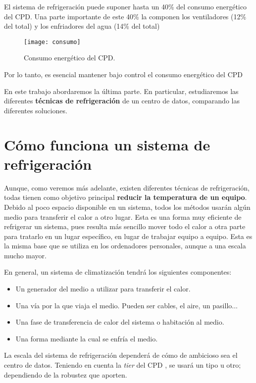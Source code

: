El sistema de refrigeración puede suponer hasta un 40\% del consumo energético del CPD. Una parte importante de este 40\% la componen los ventiladores (12\% del total) y los enfriadores del agua (14\% del total) \cite{ZHANG2021102253}

\begin{figure}
    \begin{center}
    \caption{Consumo energético del CPD.}
    \label{consumo_energetico}
    \texttt{[image: consumo]}
    \end{center}
\end{figure}

Por lo tanto, es esencial mantener bajo control el consumo energético del CPD

En este trabajo abordaremos la última parte. En particular, estudiaremos las diferentes \textbf{técnicas de refrigeración} de un centro de datos, comparando las diferentes soluciones.


\section{Cómo funciona un sistema de refrigeración}

Aunque, como veremos más adelante, existen diferentes técnicas de refrigeración, todas tienen como objetivo principal \textbf{reducir la temperatura de un equipo}. Debido al poco espacio disponible en un sistema, todos los métodos usarán algún medio para transferir el calor a otro lugar. Esta es una forma muy eficiente de refrigerar un sistema, pues resulta más sencillo mover todo el calor a otra parte para tratarlo en un lugar específico, en lugar de trabajar equipo a equipo. Esta es la misma base que se utiliza en los ordenadores personales, aunque a una escala mucho mayor.

En general, un sistema de climatización tendrá los siguientes componentes:

\begin{itemize}
    \item Un generador del medio a utilizar para transferir el calor.
    \item Una vía por la que viaja el medio. Pueden ser cables, el aire, un pasillo...
    \item Una fase de transferencia de calor del sistema o habitación al medio.
    \item Una forma mediante la cual se enfría el medio.
\end{itemize}

La escala del sistema de refrigeración dependerá de cómo de ambicioso sea el centro de datos. Teniendo en cuenta la \textit{tier} del CPD \cite{cofrico}, se usará un tipo u otro; dependiendo de la robustez que aporten.

